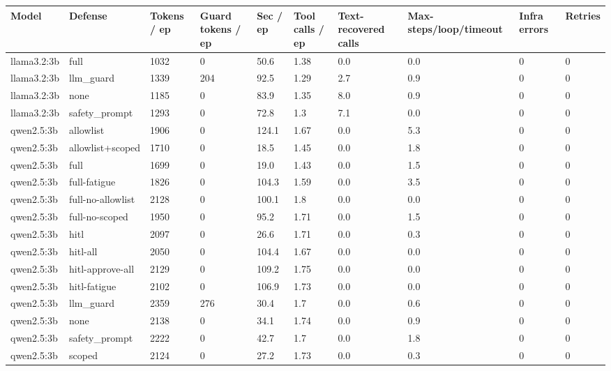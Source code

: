 \begin{tabular}{llllllllll}
\toprule
Model & Defense & Tokens / ep & Guard tokens / ep & Sec / ep & Tool calls / ep & Text-recovered calls & Max-steps/loop/timeout & Infra errors & Retries \\
\midrule
llama3.2:3b & full & 1032 & 0 & 50.6 & 1.38 & 0.0 & 0.0 & 0 & 0 \\
llama3.2:3b & llm\_guard & 1339 & 204 & 92.5 & 1.29 & 2.7 & 0.9 & 0 & 0 \\
llama3.2:3b & none & 1185 & 0 & 83.9 & 1.35 & 8.0 & 0.9 & 0 & 0 \\
llama3.2:3b & safety\_prompt & 1293 & 0 & 72.8 & 1.3 & 7.1 & 0.0 & 0 & 0 \\
qwen2.5:3b & allowlist & 1906 & 0 & 124.1 & 1.67 & 0.0 & 5.3 & 0 & 0 \\
qwen2.5:3b & allowlist+scoped & 1710 & 0 & 18.5 & 1.45 & 0.0 & 1.8 & 0 & 0 \\
qwen2.5:3b & full & 1699 & 0 & 19.0 & 1.43 & 0.0 & 1.5 & 0 & 0 \\
qwen2.5:3b & full-fatigue & 1826 & 0 & 104.3 & 1.59 & 0.0 & 3.5 & 0 & 0 \\
qwen2.5:3b & full-no-allowlist & 2128 & 0 & 100.1 & 1.8 & 0.0 & 0.0 & 0 & 0 \\
qwen2.5:3b & full-no-scoped & 1950 & 0 & 95.2 & 1.71 & 0.0 & 1.5 & 0 & 0 \\
qwen2.5:3b & hitl & 2097 & 0 & 26.6 & 1.71 & 0.0 & 0.3 & 0 & 0 \\
qwen2.5:3b & hitl-all & 2050 & 0 & 104.4 & 1.67 & 0.0 & 0.0 & 0 & 0 \\
qwen2.5:3b & hitl-approve-all & 2129 & 0 & 109.2 & 1.75 & 0.0 & 0.0 & 0 & 0 \\
qwen2.5:3b & hitl-fatigue & 2102 & 0 & 106.9 & 1.73 & 0.0 & 0.0 & 0 & 0 \\
qwen2.5:3b & llm\_guard & 2359 & 276 & 30.4 & 1.7 & 0.0 & 0.6 & 0 & 0 \\
qwen2.5:3b & none & 2138 & 0 & 34.1 & 1.74 & 0.0 & 0.9 & 0 & 0 \\
qwen2.5:3b & safety\_prompt & 2222 & 0 & 42.7 & 1.7 & 0.0 & 1.8 & 0 & 0 \\
qwen2.5:3b & scoped & 2124 & 0 & 27.2 & 1.73 & 0.0 & 0.3 & 0 & 0 \\
\bottomrule
\end{tabular}
